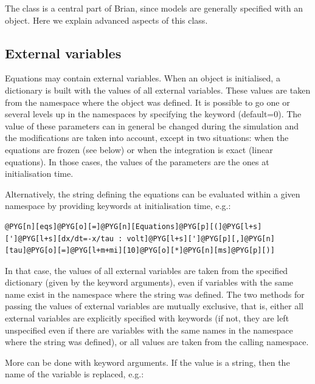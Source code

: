 \documentclass[letterpaper,10pt,english]{manual}
\begin{document}
The \hyperlink{brian.Equations}{} class is a central part of Brian, since
models are generally specified with an \hyperlink{brian.Equations}{} object.
Here we explain advanced aspects of this class.

\hypertarget{index-6}{}\subsection{External variables}

Equations may contain external variables. When an \hyperlink{brian.Equations}{} object is initialised,
a dictionary is built with the values of all external variables. These values are taken
from the namespace where the \hyperlink{brian.Equations}{} object was defined. It is possible to go one or
several levels up in the namespaces by specifying the keyword  (default=0).
The value of these parameters can in general be changed during the simulation and the
modifications are taken into account, except in two situations: when the equations are
frozen (see below) or when the integration is exact (linear equations). In those cases,
the values of the parameters are the ones at initialisation time.

Alternatively, the string defining the equations can be evaluated within a given namespace
by providing keywords at initialisation time, e.g.:

\begin{Verbatim}[commandchars=@\[\]]
@PYG[n][eqs]@PYG[o][=]@PYG[n][Equations]@PYG[p][(]@PYG[l+s][']@PYG[l+s][dx/dt=-x/tau : volt]@PYG[l+s][']@PYG[p][,]@PYG[n][tau]@PYG[o][=]@PYG[l+m+mi][10]@PYG[o][*]@PYG[n][ms]@PYG[p][)]
\end{Verbatim}

In that case, the values of all external variables are taken from the specified
dictionary (given by the keyword arguments), even if variables with the same name
exist in the namespace where the string was defined. The two methods for passing the
values of external variables are mutually exclusive, that is, either all external variables
are explicitly specified with keywords (if not, they are left unspecified even if there
are variables with the same names in the namespace where the string was defined), or all
values are taken from the calling namespace.

More can be done with keyword arguments. If the value is a string, then the name of the
variable is replaced, e.g.:
\end{document}
